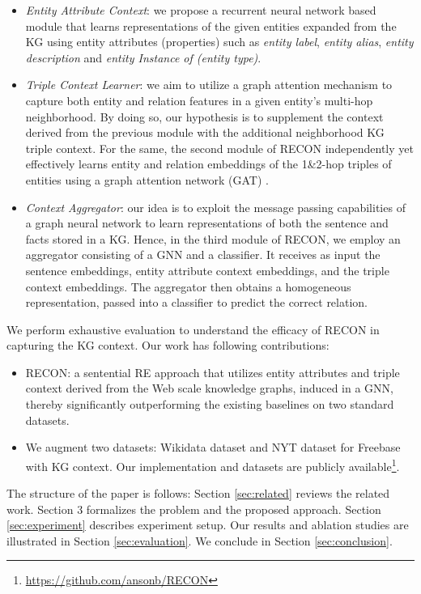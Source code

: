 \documentclass[sigconf]{acmart}
\begin{document}
\begin{itemize}
  \item \textit{Entity Attribute Context}: we propose a recurrent neural network based module that learns representations of the given entities expanded from the KG using entity attributes (properties) such as \textit{entity label}, \textit{entity alias}, \textit{entity description} and \textit{entity Instance of (entity type)}. 
  \item \textit{Triple Context Learner}: we aim to utilize a graph attention mechanism to capture both entity and relation features in a given entity's multi-hop neighborhood. By doing so, our hypothesis is to supplement the context derived from the previous module with the additional neighborhood KG triple context. For the same, the second module of RECON independently yet effectively learns entity and relation embeddings of the 1\&2-hop triples of entities using a graph attention network (GAT) \cite{velivckovic2017graph}. 
  \item \textit{Context Aggregator}: our idea is to exploit the message passing capabilities of a graph neural network \cite{DBLP:conf/acl/ZhuLLFCS19} to learn representations of both the sentence and facts stored in a KG. Hence, in the third module of RECON, we employ an aggregator consisting of a GNN and a classifier. It receives as input the sentence embeddings, entity attribute context embeddings, and the triple context embeddings. The aggregator then obtains a homogeneous representation, passed into a classifier to predict the correct relation.
\end{itemize}


We perform exhaustive evaluation to understand the efficacy of RECON in capturing the KG context. Our work has following contributions:
\begin{itemize}
\item RECON: a sentential RE approach that utilizes entity attributes and triple context derived from the Web scale knowledge graphs, induced in a GNN, thereby significantly outperforming the existing baselines on two standard datasets.
\item We augment two datasets: Wikidata dataset \cite{DBLP:conf/emnlp/SorokinG17} and NYT dataset for Freebase \cite{DBLP:conf/pkdd/RiedelYM10} with KG context. Our implementation and datasets are publicly available\footnote{\url{https://github.com/ansonb/RECON}}.
   
\end{itemize}
The structure of the paper is follows: Section \ref{sec:related} reviews the related work. Section 3 formalizes the problem and the proposed approach. Section \ref{sec:experiment} describes experiment setup. Our results and ablation studies are illustrated in Section \ref{sec:evaluation}. We conclude in Section \ref{sec:conclusion}.
 
\end{document}
